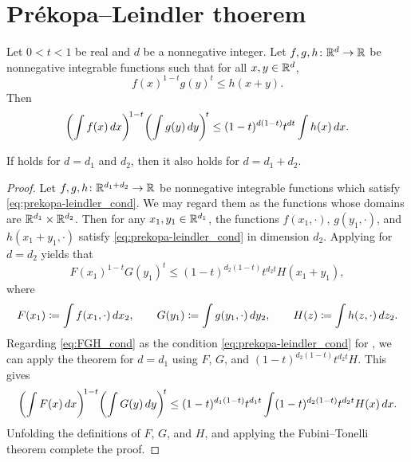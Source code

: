 \section{Pr\'{e}kopa--Leindler thoerem}

\begin{theorem}
    \label{thm:prekopa-leindler}
    Let \(0<t<1\) be real and \(d\) be a nonnegative integer. Let \(f,g,h\colon \mathbb{R}^d\to \mathbb{R}\) be nonnegative integrable functions such that for all \(x,y\in \mathbb{R}^d\),
    \begin{equation}\label{eq:prekopa-leindler_cond}
        f(x)^{1-t} g(y)^{t} \le h(x+y).
    \end{equation}
    Then
    \[
        \biggl( \int f(x) \mathop{d\!} x \biggr)^{\!1-t} \biggl( \int g(y) \mathop{d\!} y \biggr)^{\!t} \le (1-t)^{d(1-t)} t^{dt} \int h(x) \mathop{d\!} x.
    \]
\end{theorem}

\begin{lemma}
    \label{lem:prekopa-leindler-dimension-sum}
    If  holds for \(d=d_1\) and \(d_2\), then it also holds for \(d=d_1+d_2\).
\end{lemma}
\begin{proof}
    Let \(f,g,h\colon \mathbb{R}^{d_1+d_2}\to \mathbb{R}\) be nonnegative integrable functions which satisfy \eqref{eq:prekopa-leindler_cond}. We may regard them as the functions whose domains are \(\mathbb{R}^{d_1}\times \mathbb{R}^{d_2}\). Then for any \(x_1,y_1\in \mathbb{R}^{d_1}\), the functions \(f(x_1,\cdot)\), \(g(y_1,\cdot)\), and \(h(x_1+y_1,\cdot)\) satisfy \eqref{eq:prekopa-leindler_cond} in dimension \(d_2\). Applying  for \(d=d_2\) yields that
    \begin{equation}\label{eq:FGH_cond}
        F(x_1)^{1-t} G(y_1)^{t}
        \le (1-t)^{d_2(1-t)} t^{d_2t} H(x_1+y_1),
    \end{equation}
    where
    \[
        F(x_1) \coloneqq \int f(x_1,\cdot) \mathop{d\!} x_2, \qquad
        G(y_1) \coloneqq \int g(y_1,\cdot) \mathop{d\!} y_2, \qquad
        H(z) \coloneqq \int h(z,\cdot) \mathop{d\!} z_2.
    \]
    Regarding \eqref{eq:FGH_cond} as the condition \eqref{eq:prekopa-leindler_cond} for , we can apply the theorem for \(d=d_1\) using \(F\), \(G\), and \((1-t)^{d_2(1-t)} t^{d_2 t} H\). This gives
    \[
        \biggl( \int F(x) \mathop{d\!} x \biggr)^{\!1-t} \biggl( \int G(y) \mathop{d\!} y \biggr)^{\!t} 
        \le (1-t)^{d_1(1-t)} t^{d_1t} \int (1-t)^{d_2(1-t)} t^{d_2 t} H(x) \mathop{d\!} x.
    \]
    Unfolding the definitions of \(F\), \(G\), and \(H\), and applying the Fubini--Tonelli theorem complete the proof.
\end{proof}

